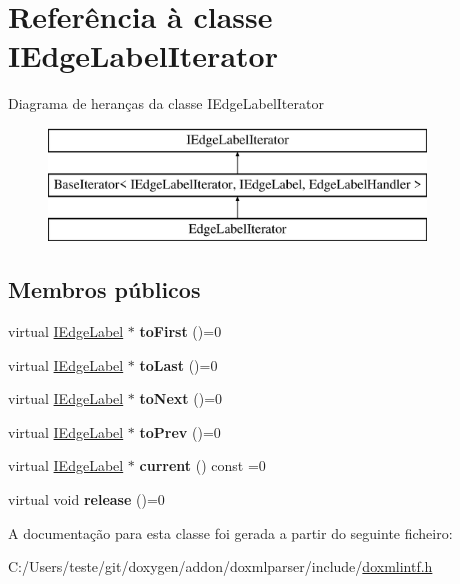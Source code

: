 \hypertarget{class_i_edge_label_iterator}{\section{Referência à classe I\-Edge\-Label\-Iterator}
\label{class_i_edge_label_iterator}
}
Diagrama de heranças da classe I\-Edge\-Label\-Iterator\begin{figure}[H]
\begin{center}
\leavevmode
\includegraphics[height=3.000000cm]{class_i_edge_label_iterator}
\end{center}
\end{figure}
\subsection*{Membros públicos}
\begin{DoxyCompactItemize}
\item 
\hypertarget{class_i_edge_label_iterator_ac05fd6efc0563fee8dd0452bae125888}{virtual \hyperlink{class_i_edge_label}{I\-Edge\-Label} $\ast$ {\bfseries to\-First} ()=0}\label{class_i_edge_label_iterator_ac05fd6efc0563fee8dd0452bae125888}

\item 
\hypertarget{class_i_edge_label_iterator_a5970b50a68ab06fdf06f1f1e0183df38}{virtual \hyperlink{class_i_edge_label}{I\-Edge\-Label} $\ast$ {\bfseries to\-Last} ()=0}\label{class_i_edge_label_iterator_a5970b50a68ab06fdf06f1f1e0183df38}

\item 
\hypertarget{class_i_edge_label_iterator_ac39c48d8656f1e6dac011971c30901d0}{virtual \hyperlink{class_i_edge_label}{I\-Edge\-Label} $\ast$ {\bfseries to\-Next} ()=0}\label{class_i_edge_label_iterator_ac39c48d8656f1e6dac011971c30901d0}

\item 
\hypertarget{class_i_edge_label_iterator_a6d6ee5b70a58590fa4530af3ceb97219}{virtual \hyperlink{class_i_edge_label}{I\-Edge\-Label} $\ast$ {\bfseries to\-Prev} ()=0}\label{class_i_edge_label_iterator_a6d6ee5b70a58590fa4530af3ceb97219}

\item 
\hypertarget{class_i_edge_label_iterator_aac2706d149988e928cb4b78eae07191f}{virtual \hyperlink{class_i_edge_label}{I\-Edge\-Label} $\ast$ {\bfseries current} () const =0}\label{class_i_edge_label_iterator_aac2706d149988e928cb4b78eae07191f}

\item 
\hypertarget{class_i_edge_label_iterator_aab0a52fdd148a54108e7bf49287d7c47}{virtual void {\bfseries release} ()=0}\label{class_i_edge_label_iterator_aab0a52fdd148a54108e7bf49287d7c47}

\end{DoxyCompactItemize}


A documentação para esta classe foi gerada a partir do seguinte ficheiro\-:\begin{DoxyCompactItemize}
\item 
C\-:/\-Users/teste/git/doxygen/addon/doxmlparser/include/\hyperlink{include_2doxmlintf_8h}{doxmlintf.\-h}\end{DoxyCompactItemize}
